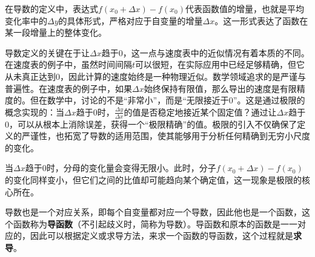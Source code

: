 在导数的定义中，表达式$f(x_0+\Delta x)-f(x_0)$代表函数值的增量，也就是平均变化率中的$\Delta y$的具体形式，严格对应于自变量的增量$\Delta x$。这一形式表达了函数在某一段增量上的整体变化。

导数定义的关键在于让$\Delta x$趋于0，这一点与速度表中的近似情况有着本质的不同。在速度表的例子中，虽然时间间隔$t$可以很短，在实际应用中已经足够精确，但它从未真正达到0，因此计算的速度始终是一种物理近似。数学领域追求的是严谨与普遍性。在速度表的例子中，如果$\Delta x$始终保持有限值，那么导出的速度是有限精度的。但在数学中，讨论的不是“非常小”，而是“无限接近于0”。这是通过极限的概念实现的：当$\Delta x$趋于0时，$\frac{\Delta y}{\Delta x}$的值是否稳定地接近某个固定值？通过让$\Delta x$趋于0，可以从根本上消除误差，获得一个“极限精确”的值。极限的引入不仅确保了定义的严谨性，也拓宽了导数的适用范围，使其能够用于分析任何精确到无穷小尺度的变化。

当$\Delta x$趋于0时，分母的变化量会变得无限小。此时，分子$f(x_0+\Delta x)-f(x_0)$的变化同样变小，但它们之间的比值却可能趋向某个确定值，这一现象是极限的核心所在。


导数也是一个对应关系，即每个自变量都对应一个导数，因此他也是一个函数，这个函数称为\textbf{导函数}（不引起歧义时，简称为导数）。导函数和原本的函数是一一对应的，因此可以根据定义或求导方法，来求一个函数的导函数，这个过程就是\textbf{求导}。


